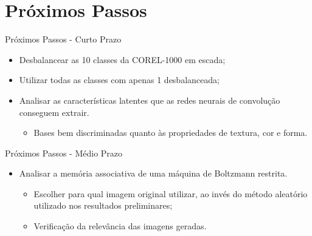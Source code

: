 \documentclass{beamer}
\begin{document}
\section{Próximos Passos}
\begin{frame}{Próximos Passos - Curto Prazo}
\setlength\leftmargini{0em}
\justifying
  \begin{itemize}
  \item Desbalancear as 10 classes da COREL-1000 em escada;
  \item Utilizar todas as classes com apenas 1 desbalanceada;
  \item Analisar as características latentes que as redes neurais de convolução conseguem extrair.
    \begin{itemize}
      \item Bases bem discriminadas quanto às propriedades de textura, cor e forma.
    \end{itemize}
  \end{itemize}
\end{frame}
\begin{frame}{Próximos Passos - Médio Prazo}
\setlength\leftmargini{0em}
\justifying
  \begin{itemize}
  \item Analisar a memória associativa de uma máquina de Boltzmann restrita.
  \begin{itemize}
    \item Escolher para qual imagem original utilizar, ao invés do método aleatório utilizado nos resultados preliminares;
    \item Verificação da relevância das imagens geradas.
  \end{itemize}
  \end{itemize}
\end{frame}
\end{document}
